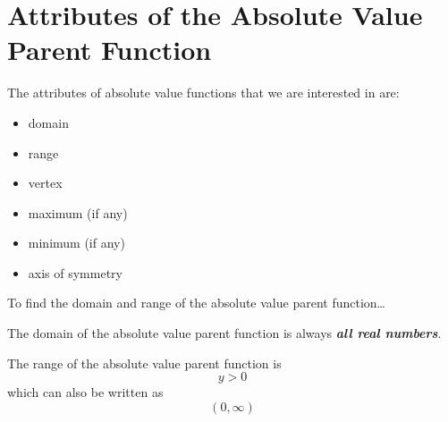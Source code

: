 

\section*{Attributes of the Absolute Value Parent Function}

The attributes of absolute value functions that we are interested in are:
\begin{itemize}[itemsep=0.1\baselineskip]
    \item domain
    \item range
    \item vertex
    \item maximum (if any)
    \item minimum (if any)
    \item axis of symmetry
\end{itemize}




\begin{myConceptSteps}{To find the domain and range of the absolute value parent function\dots}
\end{myConceptSteps}



\begin{center}
    \begin{tcolorbox}[width=4in]
        The domain of the absolute value parent function 
        is always {\bfseries\itshape all real numbers}.
    \end{tcolorbox}
\end{center}



\begin{center}
    \begin{tcolorbox}[width=4in]
        The range of the absolute value parent function 
        is 
        \[y > 0\]
        which can also be written as
        \[(0,\infty)\]
    \end{tcolorbox}
\end{center}



